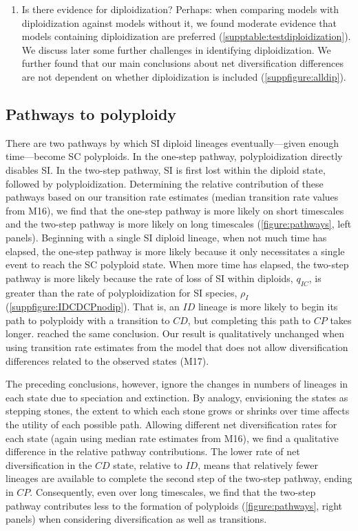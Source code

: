 \begin{enumerate}
    \item Is there evidence for diploidization?
    Perhaps: when comparing models with diploidization against models without it, we found moderate evidence that models containing diploidization are preferred (\cref{supptable:testdiploidization}).
    We discuss later some further challenges in identifying diploidization.
    We further found that our main conclusions about net diversification differences are not dependent on whether diploidization is included (\cref{suppfigure:alldip}). %

\end{enumerate}

\subsection{Pathways to polyploidy}

There are two pathways by which SI diploid lineages eventually---given enough time---become SC polyploids.
In the one-step pathway, polyploidization directly disables SI.
In the two-step pathway, SI is first lost within the diploid state, followed by polyploidization.
Determining the relative contribution of these pathways based on our transition rate estimates (median transition rate values from M16), we find that the one-step pathway is more likely on short timescales and the two-step pathway is more likely on long timescales (\cref{figure:pathways}, left panels).
Beginning with a single SI diploid lineage, when not much time has elapsed, the one-step pathway is more likely because it only necessitates a single event to reach the SC polyploid state.
When more time has elapsed, the two-step pathway is more likely because the rate of loss of SI within diploids, $q_{IC}$, is greater than the rate of polyploidization for SI species, $\rho_I$ (\cref{suppfigure:IDCDCPnodip}).
That is, an $ID$ lineage is more likely to begin its path to polyploidy with a transition to $CD$, but completing this path to $CP$ takes longer.
 reached the same conclusion.
Our result is qualitatively unchanged when using transition rate estimates from the model that does not allow diversification differences related to the observed states (M17).

The preceding conclusions, however, ignore the changes in numbers of lineages in each state due to speciation and extinction.
By analogy, envisioning the states as stepping stones, the extent to which each stone grows or shrinks over time affects the utility of each possible path.
Allowing different net diversification rates for each state (again using median rate estimates from M16), we find a qualitative difference in the relative pathway contributions. %
The lower rate of net diversification in the $CD$ state, relative to $ID$, means that relatively fewer lineages are available to complete the second step of the two-step pathway, ending in $CP$.
Consequently, even over long timescales, we find that the two-step pathway contributes less to the formation of polyploids (\cref{figure:pathways}, right panels) when considering diversification as well as transitions.